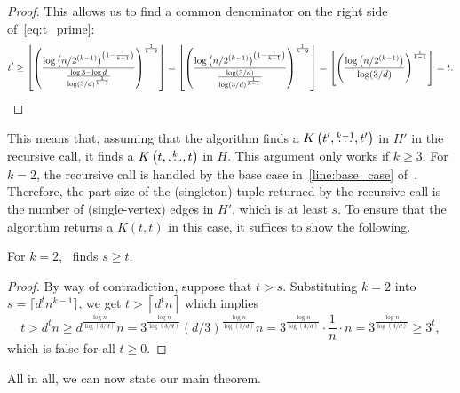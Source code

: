 \begin{lemma}
\begin{proof}
        This allows us to find a common denominator on the
        right side of~\eqref{eq:t_prime}:
        \[
            t' \geq
            \left\lfloor \left(  \frac{\log \left(n / 2^{(k-1)}\right)^{\left(1-\frac{1}{k-1}\right)}}
            {\frac{\log 3 - \log d}{\log(3 / d)^{\frac{1}{k-1}}} } \right)^
            {\frac{1}{k-2}} \right\rfloor =
            \left\lfloor \left(  \frac{\log \left(n / 2^{(k-1)}\right)^{\left( 1-\frac{1}{k-1}\right)}}
            {\frac{\log (3 / d)}{\log(3 / d)^{\frac{1}{k-1}}} } \right)^
            {\frac{1}{k-2}} \right\rfloor =
            \left\lfloor \left(  \frac{\log \left(n / 2^{(k-1)}\right)}
            {\log (3 / d)} \right)^
            {\frac{1}{k-1}} \right\rfloor =
            t. \qedhere
        \]
    \end{proof}
\end{lemma}

This means that, assuming that the algorithm finds a $K\left(t', \overset{k-1}{\dots}, t'\right)$ in $H'$ in the recursive call,
it finds a $K\left(t, \overset{k}{\dots}, t\right)$ in $H$.
This argument only works if $k \geq 3$.
For $k=2$, the recursive call is handled by the base case in~\cref{line:base_case} of~.
Therefore, the part size of the (singleton) tuple returned by the recursive call
is the number of (single-vertex) edges in $H'$, which is at least $s$.
To ensure that the algorithm returns a $K(t, t)$ in this case,
it suffices to show the following.

\begin{lemma}\label{lm:base_case}
    For $k=2$,~ finds $s \geq t$.
    \begin{proof}
        By way of contradiction, suppose that $t > s$.
        Substituting $k=2$ into $s = \lceil d^t n^{k-1} \rceil$, we get
        $t > \left\lceil d^t n \right\rceil$ which implies
        \[
            t >
            d^t n \geq
            d^{\frac{\log n}{\log (3/d)}} n =
            3^{\frac{\log n}{\log (3/d)}}(d/3)^{\frac{\log n}{\log (3/d)}} n =
            3^{\frac{\log n}{\log (3/d)}} \cdot \frac{1}{n} \cdot n =
            3^{\frac{\log n}{\log (3/d)}} \geq
            3^t,
        \]
        which is false for all $t \geq 0$.
    \end{proof}
\end{lemma}

All in all, we can now state our main theorem.

